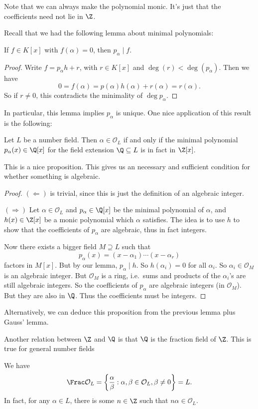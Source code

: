\documentclass[a4paper]{article}
\begin{document}
Note that we can always make the polynomial monic. It's just that the coefficients need not lie in $\Z$.

Recall that we had the following lemma about minimal polynomials:
\begin{lemma}
  If $f \in K[x]$ with $f(\alpha) = 0$, then $p_\alpha \mid f$.
\end{lemma}

\begin{proof}
  Write $f = p_\alpha h + r$, with $r \in K[x]$ and $\deg(r) < \deg (p_\alpha)$. Then we have
  \[
    0 = f(\alpha) = p(\alpha) h(\alpha) + r(\alpha) = r(\alpha).
  \]
  So if $r \not= 0$, this contradicts the minimality of $\deg p_\alpha$.
\end{proof}

In particular, this lemma implies $p_\alpha$ is unique. One nice application of this result is the following:
\begin{prop}
  Let $L$ be a number field. Then $\alpha \in \mathcal{O}_L$ if and only if the minimal polynomial $p_\alpha(x) \in \Q[x]$ for the field extension $\Q \subseteq L$ is in fact in $\Z[x]$.
\end{prop}
This is a nice proposition. This gives us an necessary and sufficient condition for whether something is algebraic.
\begin{proof}
  $(\Leftarrow)$ is trivial, since this is just the definition of an algebraic integer.

  $(\Rightarrow)$ Let $\alpha \in \mathcal{O}_L$ and $p_\alpha \in \Q[x]$ be the minimal polynomial of $\alpha$, and $h(x) \in \Z[x]$ be a monic polynomial which $\alpha$ satisfies. The idea is to use $h$ to show that the coefficients of $p_\alpha$ are algebraic, thus in fact integers.

  Now there exists a bigger field $M \supseteq L$ such that
  \[
    p_\alpha(x) = (x - \alpha_1) \cdots (x - \alpha_r)
  \]
  factors in $M[x]$. But by our lemma, $p_\alpha \mid h$. So $h(\alpha_i) = 0$ for all $\alpha_i$. So $\alpha_i \in \mathcal{O}_M$ is an algebraic integer. But $\mathcal{O}_M$ is a ring, i.e.\ sums and products of the $\alpha_i$'s are still algebraic integers. So the coefficients of $p_\alpha$ are algebraic integers (in $\mathcal{O}_M$). But they are also in $\Q$. Thus the coefficients must be integers.
\end{proof}
Alternatively, we can deduce this proposition from the previous lemma plus Gauss' lemma.

Another relation between $\Z$ and $\Q$ is that $\Q$ is the fraction field of $\Z$. This is true for general number fields
\begin{lemma}
  We have
  \[
    \Frac \mathcal{O}_L = \left\{\frac{\alpha}{\beta}: \alpha, \beta \in \mathcal{O}_L, \beta \not= 0\right\} = L.
  \]
  In fact, for any $\alpha \in L$, there is some $n \in \Z$ such that $n\alpha \in \mathcal{O}_L$.
\end{lemma}
\end{document}
